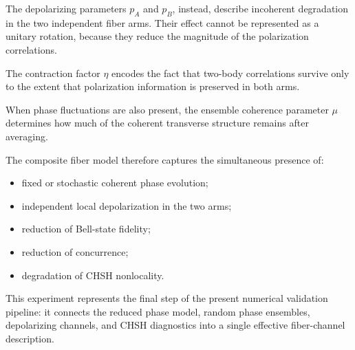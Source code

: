 The depolarizing parameters \( p_A \) and \( p_B \), instead, describe incoherent degradation in the two independent fiber arms. Their effect cannot be represented as a unitary rotation, because they reduce the magnitude of the polarization correlations.

The contraction factor \(\eta \) encodes the fact that two-body correlations survive only to the extent that polarization information is preserved in both arms.

When phase fluctuations are also present, the ensemble coherence parameter \( \mu \) determines how much of the coherent transverse structure remains after averaging.

The composite fiber model therefore captures the simultaneous presence of:

\begin{itemize}
    \item fixed or stochastic coherent phase evolution;
    \item independent local depolarization in the two arms;
    \item reduction of Bell-state fidelity;
    \item reduction of concurrence;
    \item degradation of CHSH nonlocality.
\end{itemize}

This experiment represents the final step of the present numerical validation pipeline: it connects the reduced phase model, random phase ensembles, depolarizing channels, and CHSH diagnostics into a single effective fiber-channel description.

